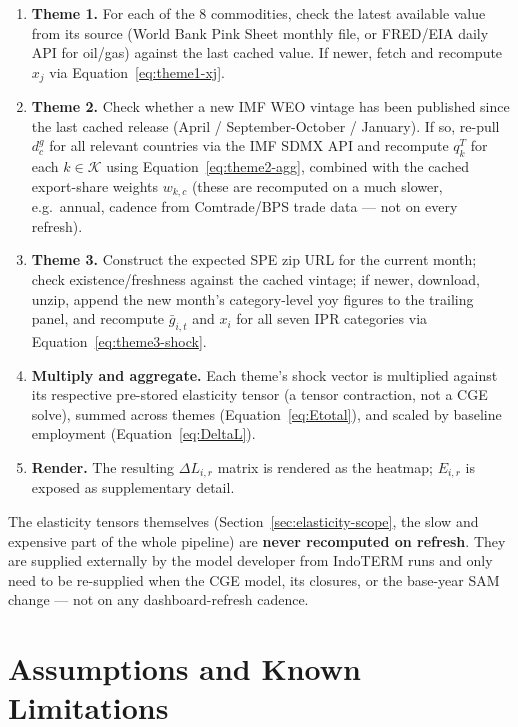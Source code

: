 \documentclass[11pt]{article}
\begin{document}
\begin{enumerate}
  \item \textbf{Theme 1.} For each of the 8 commodities, check the latest
  available value from its source (World Bank Pink Sheet monthly file, or
  FRED/EIA daily API for oil/gas) against the last cached value. If newer,
  fetch and recompute $x_j$ via Equation~\eqref{eq:theme1-xj}.
  \item \textbf{Theme 2.} Check whether a new IMF WEO vintage has been
  published since the last cached release (April / September-October /
  January). If so, re-pull $d^g_c$ for all relevant countries via the IMF
  SDMX API and recompute $q_k^T$ for each $k \in \mathcal{K}$ using
  Equation~\eqref{eq:theme2-agg}, combined with the cached export-share
  weights $w_{k,c}$ (these are recomputed on a much slower, e.g.\ annual,
  cadence from Comtrade/BPS trade data --- not on every refresh).
  \item \textbf{Theme 3.} Construct the expected SPE zip URL for the current
  month; check existence/freshness against the cached vintage; if newer,
  download, unzip, append the new month's category-level yoy figures to the
  trailing panel, and recompute $\bar g_{i,t}$ and $x_i$ for all seven IPR
  categories via Equation~\eqref{eq:theme3-shock}.
  \item \textbf{Multiply and aggregate.} Each theme's shock vector is
  multiplied against its respective pre-stored elasticity tensor (a tensor
  contraction, not a CGE solve), summed across themes
  (Equation~\eqref{eq:Etotal}), and scaled by baseline employment
  (Equation~\eqref{eq:DeltaL}).
  \item \textbf{Render.} The resulting $\Delta L_{i,r}$ matrix is rendered as
  the heatmap; $E_{i,r}$ is exposed as supplementary detail.
\end{enumerate}

\begin{decisionbox}
The elasticity tensors themselves (Section~\ref{sec:elasticity-scope}, the
slow and expensive part of the whole pipeline) are \textbf{never recomputed
on refresh}. They are supplied externally by the model developer from
IndoTERM runs and only need to be re-supplied when the CGE model, its
closures, or the base-year SAM change --- not on any dashboard-refresh
cadence.
\end{decisionbox}

\section{Assumptions and Known Limitations}
\label{sec:limitations}
\end{document}

